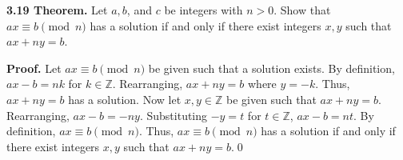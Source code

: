 \documentclass[12pt]{article}
\begin{document}
\noindent\textbf{3.19 Theorem.} Let $a,b$, and $c$ be integers with $n>0$. Show that $ax\equiv b\pmod n$ has a solution if and only if there exist integers $x,y$ such that $ax+ny=b$.

\bigskip

\noindent\textbf{Proof.} Let $ax\equiv b\pmod n$ be given such that a solution exists. By definition, $ax-b=nk$ for $k\in\mathbb{Z}$. Rearranging, $ax+ny=b$ where $y=-k$. Thus, $ax+ny=b$ has a solution. Now let $x,y\in\mathbb{Z}$ be given such that $ax+ny=b$. Rearranging, $ax-b=-ny$. Substituting $-y=t$ for $t\in\mathbb{Z}$, $ax-b=nt$. By definition, $ax\equiv b \pmod n$. Thus, $ax\equiv b\pmod n$ has a solution if and only if there exist integers $x,y$ such that $ax+ny=b$.\qed
\end{document}
